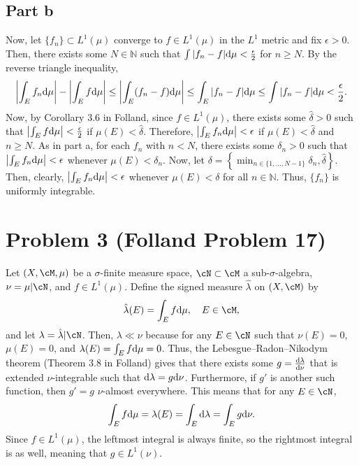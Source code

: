 \documentclass{article}
\begin{document}
\subsection{Part b}
Now, let $\{f_n\}\subset L^1(\mu)$ converge to $f\in L^1(\mu)$ in the $L^1$ metric and fix $\epsilon>0$. Then, there exists some $N\in\mathbb{N}$ such that $\int |f_n-f|\mathrm{d}\mu<\frac{\epsilon}{2}$ for $n\geq N$. By the reverse triangle inequality, 
\[
\left|\int_E f_n\mathrm{d}\mu\right|-\left|\int_E f\mathrm{d}\mu\right|\leq \left|\int_E (f_n-f)\mathrm{d}\mu\right|\leq\int_E |f_n-f|\mathrm{d}\mu\leq\int |f_n-f|\mathrm{d}\mu<\frac{\epsilon}{2}.
\]
Now, by Corollary 3.6 in Folland, since $f\in L^1(\mu)$, there exists some $\hat\delta>0$ such that $\left|\int_E f\mathrm{d}\mu\right|<\frac{\epsilon}{2}$ if $\mu(E)<\hat\delta$. Therefore, $\left|\int_E f_n\mathrm{d}\mu\right|<\epsilon$ if $\mu(E)<\hat\delta$ and $n\geq N$. As in part a, for each $f_n$ with $n<N$, there exists some $\delta_n>0$ such that $\left|\int_Ef_n\mathrm{d}\mu\right|<\epsilon$ whenever $\mu(E)<\delta_n$. Now, let $\delta=\left\{\min_{n\in\{1,\ldots,N-1\}}\delta_n,\hat\delta\right\}$. Then, clearly, $\left|\int_Ef_n\mathrm{d}\mu\right|<\epsilon$ whenever $\mu(E)<\delta$ for all $n\in\mathbb{N}$. Thus, $\{f_n\}$ is uniformly integrable. 

\section{Problem 3 (Folland Problem 17)}
Let $(X,\cM,\mu)$ be a $\sigma$-finite measure space, $\cN\subset\cM$ a sub-$\sigma$-algebra, $\nu=\mu|\cN$, and $f\in L^1(\mu)$. Define the signed measure $\hat\lambda$ on $(X,\cM)$ by
\[
\hat\lambda(E)=\int_Ef\df\mu,\quad E\in\cM,
\]
and let $\lambda=\hat\lambda|\cN$. Then, $\lambda\ll\nu$ because for any $E\in\cN$ such that $\nu(E)=0$, $\mu(E)=0$, and $\lambda(E)=\int_Ef\mathrm{d}\mu=0$. Thus, the Lebesgue--Radon--Nikodym theorem (Theorem 3.8 in Folland) gives that there exists some $g=\frac{\mathrm{d}\lambda}{\mathrm{d}\nu}$ that is extended $\nu$-integrable such that $\mathrm{d}\lambda=g\mathrm{d}\nu$. Furthermore, if $g'$ is another such function, then $g'=g$ $\nu$-almost everywhere. This means that for any $E\in\cN$,
\[
\int_Ef\mathrm{d}\mu=\lambda(E)=\int_E\mathrm{d}\lambda=\int_Eg\mathrm{d}\nu.
\]
Since $f\in L^1(\mu)$, the leftmost integral is always finite, so the rightmost integral is as well, meaning that $g\in L^1(\nu)$. 
\end{document}
